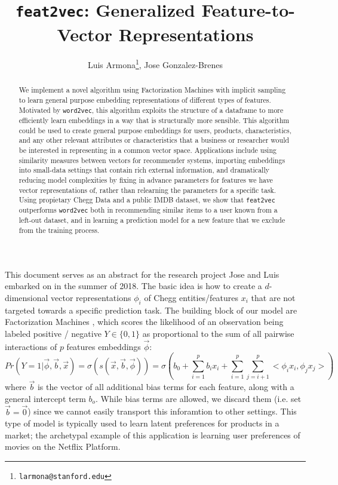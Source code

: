 \documentclass{article}
\begin{document}
\title{\texttt{feat2vec}: Generalized Feature-to-Vector Representations}
\author{Luis Armona\thanks{\texttt{larmona@stanford.edu}}, Jose Gonzalez-Brenes}
\maketitle


\begin{abstract}
We implement a novel algorithm using Factorization Machines with implicit sampling to learn general purpose embedding representations of different types of features. Motivated by \texttt{word2vec}, this algorithm exploits the structure of a dataframe to more efficiently learn embeddings in a way that is structurally more sensible. This algorithm could be used to create general purpose embeddings for users, products, characteristics, and any other relevant attributes or characteristics that a business or researcher would be interested in representing in a common vector space. Applications include using similarity measures between vectors for recommender systems, importing embeddings into small-data settings that contain rich external information, and dramatically reducing model complexities by fixing in advance parameters for features we have vector representations of, rather than relearning the parameters for a specific task. Using propietary Chegg Data and a public IMDB dataset, we show that \texttt{feat2vec} outperforms \texttt{word2vec} both in recommending similar items to a user known from a left-out dataset, and in learning a prediction model for a new feature that we exclude from the training process.
\end{abstract}

This document serves as an abstract for the research project Jose and Luis embarked on in the summer of 2018.
The basic idea is how to create a $d$-dimensional vector representations $\phi_i$ of Chegg entities/features $x_i$ that are not targeted towards a specific prediction task. 
The building block of our model are Factorization Machines \cite{fm}, which scores the likelihood of an observation being labeled positive / negative $Y \in \{0,1\}$ as proportional to the sum of all pairwise interactions of $p$ features embeddings $\vec{\phi}$:
\[Pr(Y=1|\vec{\phi},\vec{b},\vec{x}) = \sigma(s(\vec{x},\vec{b},\vec{\phi}))=\sigma( b_0 + \sum_{i=1}^p b_i x_i + \sum_{i=1}^p \sum_{j=i+1}^p <\phi_i x_i,\phi_j x_j> ) \]
where $\vec{b}$ is the vector of all additional bias terms for each feature, along with a general intercept term $b_o$. While bias terms are allowed, we discard them (i.e. set $\vec{b}=\vec{0}$) since we cannot easily transport this inforamtion to other settings. This type of model is typically used to learn latent preferences for products in a market; the archetypal example of this application is learning user preferences of movies on the Netflix Platform\cite{mfRecs}. 
\end{document}
